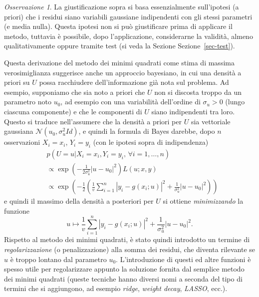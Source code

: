 \documentclass[
  italian,
  letterpaper,
]{book}
\newcommand{\bra}[1]{\left( #1 \right)}
\theoremstyle{definition}
\theoremstyle{remark}
\newtheorem*{remark}{Osservazione}
\begin{document}
\begin{remark}
La giustificazione sopra si basa essenzialmente sull'ipotesi (a priori)
che i residui siano variabili gaussiane indipendenti con gli stessi
parametri (e media nulla). Questa ipotesi non si può giustificare prima
di applicare il metodo, tuttavia è possibile, dopo l'applicazione,
considerarne la validità, almeno qualitativamente oppure tramite test
(si veda la Sezione Sezione~\ref{sec-test}).
\end{remark}

Questa derivazione del metodo dei minimi quadrati come stima di massima
verosimiglianza suggerisce anche un approccio bayesiano, in cui una
densità a priori su \(U\) possa racchiudere dell'informazione già nota
sul problema. Ad esempio, supponiamo che sia noto a priori che \(U\) non
si discosta troppo da un parametro noto \(u_0\), ad esempio con una
variabilità dell'ordine di \(\sigma_u>0\) (lungo ciascuna componente) e
che le componenti di \(U\) siano indipendenti tra loro. Questo si
traduce nell'assumere che la densità a priori per \(U\) sia vettoriale
gaussiana \(\mathcal{N}(u_0, \sigma_u^2 Id)\), e quindi la formula di
Bayes darebbe, dopo \(n\) osservazioni \(X_i =x_i\), \(Y_i= y_i\) (con
le ipotesi sopra di indipendenza)
\[ \begin{split}&  p(U = u | X_i=x_i, Y_i= y_i, \,  \forall i=1, \ldots, n) \\
& \propto \exp\bra{ -\frac 1 {2\sigma_u^2} |u-u_0|^2} L(u; x, y)\\
& \propto \exp\bra{ -\frac 1 {2} \bra{ \frac 1 v \sum_{i=1}^n |y_i-g(x_i;u)|^2 +\frac 1 {\sigma_u^2} |u-u_0|^2}}\end{split}\]
e quindi il massimo della densità a posteriori per \(U\) si ottiene
\emph{minimizzando} la funzione
\[ u \mapsto \frac 1 v \sum_{i=1}^n |y_i-g(x_i;u)|^2 +\frac 1 {\sigma_u^2} |u-u_0|^2. \]
Rispetto al metodo dei minimi quadrati, è stato quindi introdotto un
termine di \emph{regolarizzazione} (o penalizzazione) alla somma dei
residui, che diventa rilevante se \(u\) è troppo lontano dal parametro
\(u_0\). L'introduzione di questi ed altre funzioni è spesso utile per
regolarizzare appunto la soluzione fornita dal semplice metodo dei
minimi quadrati (queste tecniche hanno diversi nomi a seconda del tipo
di termini che si aggiungono, ad esempio \emph{ridge}, \emph{weight
decay}, \emph{LASSO}, ecc.).
\end{document}
